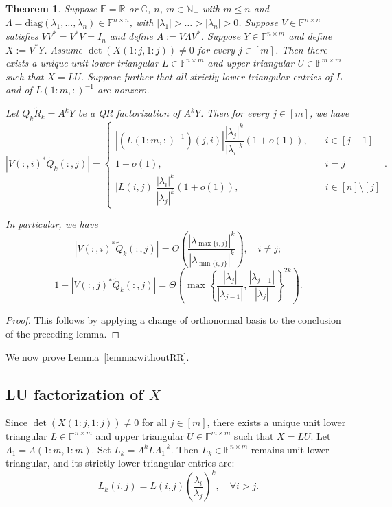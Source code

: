 \documentclass[11pt,a4paper]{article}
\theoremstyle{plain}              %
\newtheorem{theorem}{Theorem}[section]
\theoremstyle{definition}         %
\begin{document}
\begin{theorem}
Suppose \(\mathbb{F}=\mathbb{R}\) or \(\mathbb{C}\), \(n\), \(m\in\mathbb{N}_+\) with \(m\leq n\) and \(\Lambda=\mathrm{diag}(\lambda_1,\dots,\lambda_n)\in\mathbb{F}^{n\times n}\), with \(|\lambda_1|>\dots>|\lambda_n|>0\). Suppose \(V\in\mathbb{F}^{n\times n}\) satisfies \(VV^*=V^*V=I_n\) and define \(A:=V\Lambda V^*\). Suppose \(Y\in\mathbb{F}^{n\times m}\) and define \(X:=V^*Y\). Assume \(\det(X(1:j,1:j))\neq 0\) for every \(j\in[m]\). Then there exists a unique unit lower triangular \(L\in\mathbb{F}^{n\times m}\) and upper triangular \(U\in\mathbb{F}^{m\times m}\) such that \(X=LU\). Suppose further that all strictly lower triangular entries of \(L\) and of \(L(1:m,:)^{-1}\) are nonzero.

Let \(\tilde{Q}_k\tilde{R}_k=A^kY\) be a QR factorization of \(A^kY\). Then for every \(j\in[m]\), we have
\[
|V(:,i)^*\tilde{Q}_k(:,j)|=\begin{cases}
|(L(1:m,:)^{-1})(j,i)|\dfrac{|\lambda_j|^k}{|\lambda_i|^k}(1+o(1)),\quad&i\in[j-1]\\
1+o(1),\quad&i=j\\
|L(i,j)|\dfrac{|\lambda_i|^k}{|\lambda_j|^k}(1+o(1)),\quad&i\in[n]\setminus[j]
\end{cases}.
\]

In particular, we have
\[
|V(:,i)^*\tilde{Q}_k(:,j)|=\Theta\left(\dfrac{|\lambda_{\max\{i,j\}}|^k}{|\lambda_{\min\{i,j\}}|^k}\right),\quad i\neq j;
\]
\[
1-|V(:,j)^*\tilde{Q}_k(:,j)|=\Theta\left(\max\left\{\dfrac{|\lambda_j|}{|\lambda_{j-1}|},\dfrac{|\lambda_{j+1}|}{|\lambda_j|}\right\}^{2k}\right).
\]
\end{theorem}
\begin{proof}
This follows by applying a change of orthonormal basis to the conclusion of the preceding lemma.
\end{proof}

We now prove Lemma~\ref{lemma:withoutRR}.

\subsection{LU factorization of \(X\)}

Since \(\det(X(1:j,1:j))\neq 0\) for all \(j\in[m]\), there exists a unique unit lower triangular \(L\in\mathbb{F}^{n\times m}\) and upper triangular \(U\in\mathbb{F}^{m\times m}\) such that \(X=LU\). Let \(\Lambda_1=\Lambda(1:m,1:m)\). Set \(L_k=\Lambda^kL\Lambda_1^{-k}\). Then \(L_k\in\mathbb{F}^{n\times m}\) remains unit lower triangular, and its strictly lower triangular entries are:
\[
L_k(i,j)=L(i,j)\left(\dfrac{\lambda_i}{\lambda_j}\right)^k,\quad\forall i>j.
\]
\end{document}
